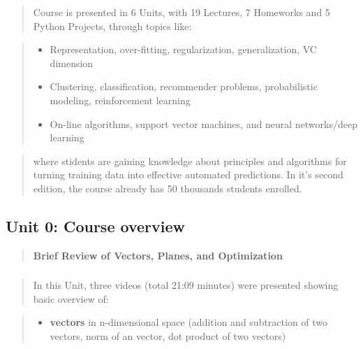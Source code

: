 \documentclass[]{article}
\providecommand{\tightlist}{%
  \setlength{\itemsep}{0pt}\setlength{\parskip}{0pt}}
\begin{document}
\begin{quote}
Course is presented in 6 Units, with 19 Lectures, 7 Homeworks and 5
Python Projects, through topics like:
\end{quote}

\begin{quote}
\begin{itemize}
\tightlist
\item
  Representation, over-fitting, regularization, generalization, VC
  dimension
\item
  Clustering, classification, recommender problems, probabilistic
  modeling, reinforcement learning
\item
  On-line algorithms, support vector machines, and neural networks/deep
  learning
\end{itemize}
\end{quote}

\begin{quote}
where stidents are gaining knowledge about principles and algorithms for
turning training data into effective automated predictions. In it's
second edition, the course already has 50 thousands students enrolled.
\end{quote}

\newpage

\hypertarget{unit-0-course-overview}{%
\subsection{Unit 0: Course overview}\label{unit-0-course-overview}}

\begin{quote}
\textbf{Brief Review of Vectors, Planes, and Optimization }
\end{quote}

\hypertarget{section-2}{%
\subsubsection{}\label{section-2}}

\begin{quote}
In this Unit, three videos (total 21:09 minutes) were presented showing
basic overview of:
\end{quote}

\begin{quote}
\begin{itemize}
\tightlist
\item
  \textbf{vectors} in n-dimensional space (addition and subtraction of
  two vectors, norm of an vector, dot product of two vectors)
\end{itemize}
\end{quote}
\end{document}
